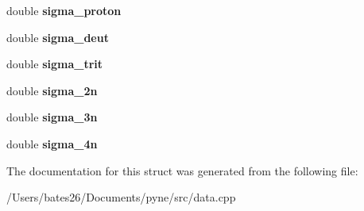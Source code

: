 \begin{DoxyCompactItemize}
\item 
\hypertarget{structsimple__xs_aff5767a5644512bc20acdb7b6be11f6a}{double {\bfseries sigma\+\_\+proton}}\label{structsimple__xs_aff5767a5644512bc20acdb7b6be11f6a}

\item 
\hypertarget{structsimple__xs_a144a201fa75999fe72b1e7ff6cf599de}{double {\bfseries sigma\+\_\+deut}}\label{structsimple__xs_a144a201fa75999fe72b1e7ff6cf599de}

\item 
\hypertarget{structsimple__xs_ac94cd1b3c4d07c830484563268c9e3b4}{double {\bfseries sigma\+\_\+trit}}\label{structsimple__xs_ac94cd1b3c4d07c830484563268c9e3b4}

\item 
\hypertarget{structsimple__xs_a48428459c08bd8e7ca73ede3d5d1b12d}{double {\bfseries sigma\+\_\+2n}}\label{structsimple__xs_a48428459c08bd8e7ca73ede3d5d1b12d}

\item 
\hypertarget{structsimple__xs_a2d20b02fe8098c55466d12de065bfdee}{double {\bfseries sigma\+\_\+3n}}\label{structsimple__xs_a2d20b02fe8098c55466d12de065bfdee}

\item 
\hypertarget{structsimple__xs_a1c2a32a82a8f3e381d67b778c89c499e}{double {\bfseries sigma\+\_\+4n}}\label{structsimple__xs_a1c2a32a82a8f3e381d67b778c89c499e}

\end{DoxyCompactItemize}


The documentation for this struct was generated from the following file\+:\begin{DoxyCompactItemize}
\item 
/\+Users/bates26/\+Documents/pyne/src/data.\+cpp\end{DoxyCompactItemize}
